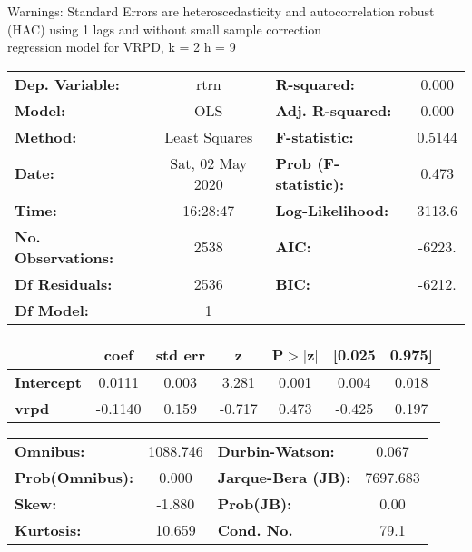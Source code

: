 Warnings: \newline
 [1] Standard Errors are heteroscedasticity and autocorrelation robust (HAC) using 1 lags and without small sample correction\\ 

regression model for VRPD, k = 2 h = 9\begin{center}
\begin{tabular}{lclc}
\toprule
\textbf{Dep. Variable:}    &       rtrn       & \textbf{  R-squared:         } &     0.000   \\
\textbf{Model:}            &       OLS        & \textbf{  Adj. R-squared:    } &     0.000   \\
\textbf{Method:}           &  Least Squares   & \textbf{  F-statistic:       } &    0.5144   \\
\textbf{Date:}             & Sat, 02 May 2020 & \textbf{  Prob (F-statistic):} &    0.473    \\
\textbf{Time:}             &     16:28:47     & \textbf{  Log-Likelihood:    } &    3113.6   \\
\textbf{No. Observations:} &        2538      & \textbf{  AIC:               } &    -6223.   \\
\textbf{Df Residuals:}     &        2536      & \textbf{  BIC:               } &    -6212.   \\
\textbf{Df Model:}         &           1      & \textbf{                     } &             \\
\bottomrule
\end{tabular}
\begin{tabular}{lcccccc}
                   & \textbf{coef} & \textbf{std err} & \textbf{z} & \textbf{P$> |$z$|$} & \textbf{[0.025} & \textbf{0.975]}  \\
\midrule
\textbf{Intercept} &       0.0111  &        0.003     &     3.281  &         0.001        &        0.004    &        0.018     \\
\textbf{vrpd}      &      -0.1140  &        0.159     &    -0.717  &         0.473        &       -0.425    &        0.197     \\
\bottomrule
\end{tabular}
\begin{tabular}{lclc}
\textbf{Omnibus:}       & 1088.746 & \textbf{  Durbin-Watson:     } &    0.067  \\
\textbf{Prob(Omnibus):} &   0.000  & \textbf{  Jarque-Bera (JB):  } & 7697.683  \\
\textbf{Skew:}          &  -1.880  & \textbf{  Prob(JB):          } &     0.00  \\
\textbf{Kurtosis:}      &  10.659  & \textbf{  Cond. No.          } &     79.1  \\
\bottomrule
\end{tabular}
\end{center}

